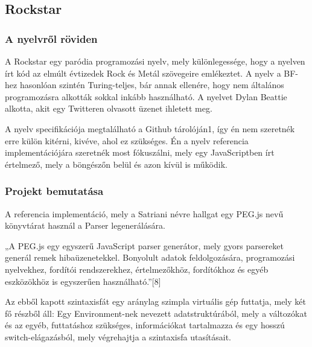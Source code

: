 \subsection{Rockstar}

\subsubsection{A nyelvről röviden}

A Rockstar\cite{rockstar} egy paródia programozási nyelv, mely különlegessége, hogy a nyelven írt kód az elmúlt évtizedek Rock és Metál szövegeire emlékeztet. A nyelv a BF-hez hasonlóan szintén Turing-teljes, bár annak ellenére, hogy nem általános programozásra alkották sokkal inkább használható. A nyelvet Dylan Beattie alkotta, akit egy Twitteren olvasott üzenet ihletett meg.

A nyelv specifikációja megtalálható a Github tárolóján1, így én nem szeretnék erre külön kitérni, kivéve, ahol ez szükséges. Én a nyelv referencia implementációjára szeretnék most fókuszálni, mely egy JavaScriptben írt értelmező, mely a böngészőn belül és azon kívül is működik.

\subsubsection{Projekt bemutatása}

A referencia implementáció, mely a Satriani névre hallgat egy PEG.js nevű könyvtárat használ a Parser legenerálására.

„A PEG.js egy egyszerű JavaScript parser generátor, mely gyors parsereket generál remek hibaüzenetekkel. Bonyolult adatok feldolgozására, programozási nyelvekhez, fordítói rendszerekhez, értelmezőkhöz, fordítókhoz és egyéb eszközökhöz is egyszerűen használható.”[8]

Az ebből kapott szintaxisfát egy aránylag szimpla virtuális gép futtatja, mely két fő részből áll: Egy Environment-nek nevezett adatstruktúrából, mely a változókat és az egyéb, futtatáshoz szükséges, információkat tartalmazza és egy hosszú switch-elágazásból, mely végrehajtja a szintaxisfa utasításait.